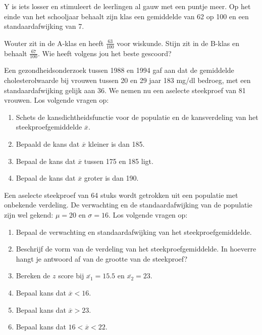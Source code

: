 {\begin{exercise}
  Y is iets losser en stimuleert de leerlingen al gauw met een puntje meer. Op het einde van het schooljaar behaalt zijn klas een gemiddelde van 62 op 100 en een standaardafwijking van 7.

  Wouter zit in de A-klas en heeft $\frac{63}{100}$ voor wiskunde. Stijn zit in de B-klas en behaalt $\frac{67}{100}$. Wie heeft volgens jou het beste gescoord?
\end{exercise}

\begin{exercise}
  Een gezondheidsonderzoek tussen 1988 en 1994 gaf aan dat de gemiddelde cholesterolwaarde bij vrouwen tussen 20 en 29 jaar 183 mg/dl bedroeg, met een standaardafwijking gelijk aan 36. We nemen nu een aselecte steekproef van 81 vrouwen. Los volgende vragen op:
  
  \begin{enumerate}[label=\alph*.]
    \item Schets de kansdichtheidsfunctie voor de populatie en de kansverdeling van het steekproefgemiddelde $\overline{x}$.
    \item Bepaald de kans dat $\overline{x}$ kleiner is dan 185.
    \item Bepaal de kans dat $\overline{x}$ tussen 175 en 185 ligt.
    \item Bepaal de kans dat $\overline{x}$ groter is dan 190. 
  \end{enumerate}
\end{exercise}

\begin{exercise}
  Een aselecte steekproef van 64 stuks wordt getrokken uit een populatie met onbekende verdeling. De verwachting en de standaardafwijking van de populatie
  zijn wel gekend: $\mu = 20$ en $\sigma=16$. Los volgende vragen op:
  
  \begin{enumerate}[label=\alph*.]
    \item Bepaal de verwachting en standaardafwijking van het steekproefgemiddelde.
    \item Beschrijf de vorm van de verdeling van het steekproefgemiddelde. In hoeverre hangt je antwoord af van de grootte van de steekproef?
    \item Bereken de $z$ score bij $\overline{x_{1}} = 15.5$ en $\overline{x_{2}} = 23$.
    \item Bepaal kans dat $\overline{x} <16$.
    \item Bepaal kans dat $\overline{x} > 23$.
    \item Bepaal kans dat $16< \overline{x}< 22$.
  \end{enumerate}
\end{exercise}

}
